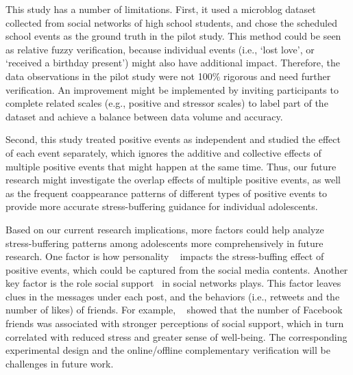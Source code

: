 \documentclass[5p,times,numbers,authoryear]{elsarticle}
\begin{document}
This study has a number of limitations.
First, it used a microblog dataset collected from social networks of high school students,
and chose the scheduled school events as the ground truth in the pilot study.
This method could be seen as relative fuzzy verification,
because individual events (i.e., `lost love', or `received a birthday present') might also have additional impact.
Therefore, the data observations in the pilot study were not 100\% rigorous and need further verification.
An improvement might be implemented by inviting participants to complete related scales (e.g., positive and stressor scales) to label part of the dataset and achieve a balance between data volume and accuracy.

Second, this study treated positive events as independent and studied the effect of each event separately, which ignores the additive and collective effects of multiple positive events that might happen at the same time.
Thus, our future research might investigate the overlap effects of multiple positive events,
as well as the frequent coappearance patterns of different types of positive events to provide more accurate stress-buffering guidance for individual adolescents.

Based on our current research implications, more factors could help analyze stress-buffering patterns among adolescents more comprehensively in future research.
One factor is how personality ~\citep{personality1,personality2} impacts the stress-buffing effect of positive events,
which could be captured from the social media contents.
Another key factor is the role social support~\citep{socialSupport1, socialSupport2} in social networks plays.
This factor leaves clues in the messages under each post,
and the behaviors (i.e., retweets and the number of likes) of friends.
For example, ~\citep{socialSupport1} showed that the number of Facebook friends was associated with stronger perceptions of social support,
which in turn correlated with reduced stress and greater sense of well-being.
The corresponding experimental design and the online/offline complementary verification will be challenges in future work.




\end{document}
